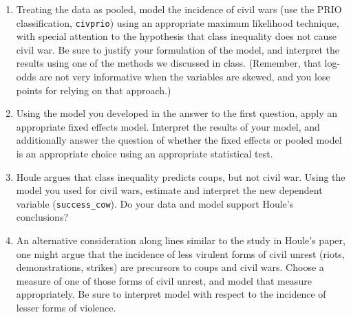 \documentclass[12pt]{article}
\begin{document}
\begin{enumerate}
\item Treating the data as pooled, model the incidence of civil wars (use the PRIO classification, {\tt civprio}) using an appropriate maximum likelihood technique, with special attention to the hypothesis that class inequality does not cause civil war. Be sure to justify your formulation of the model, and interpret the results using one of the methods we discussed in class. (Remember, that log-odds are not very informative when the variables are skewed, and you lose points for relying on that approach.)

\item Using the model you developed in the answer to the first question, apply an appropriate fixed effects model. Interpret the results of your model, and additionally answer the question of whether the fixed effects or pooled model is an appropriate choice using an appropriate statistical test.

\item Houle argues that class inequality predicts coups, but not civil war. Using the model you used for civil wars, estimate and interpret the new dependent variable ({\tt success\_cow}). Do your data and model support Houle's conclusions?

\item An alternative consideration along lines similar to the study in Houle's paper, one might argue that the incidence of less virulent forms of civil unrest (riots, demonstrations, strikes) are precursors to coups and civil wars. Choose a measure of one of those forms of civil unrest, and model that measure appropriately. Be sure to interpret model with respect to the incidence of lesser forms of violence.
\end{enumerate}
\end{document}
